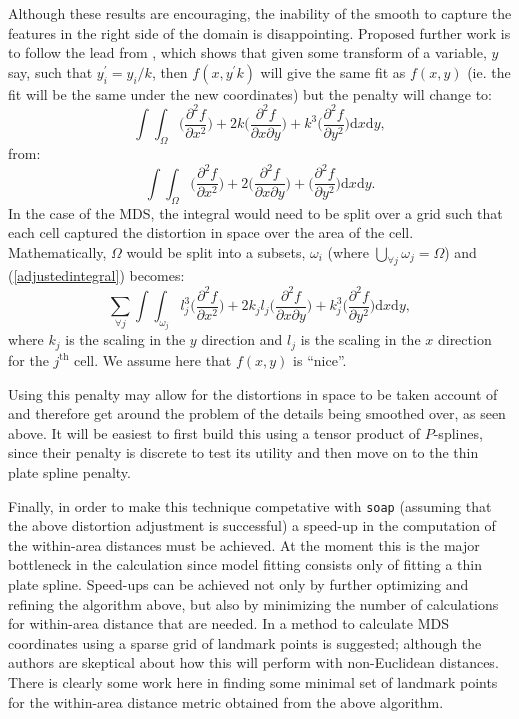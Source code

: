 \documentclass[a4paper,10pt]{article}
\begin{document}
Although these results are encouraging, the inability of the smooth to capture the features in the right side of the domain is disappointing. Proposed further work is to follow the lead from \cite{wood2000}, which shows that given some transform of a variable, $y$ say, such that $y_i^\prime=y_i/k$, then $f(x,y^\prime k)$ will give the same fit as $f(x,y)$ (ie. the fit will be the same under the new coordinates) but the penalty will change to:
\begin{equation}
\int\int_\Omega \Big( \frac{\partial^2 f}{\partial x^2} \Big) + 2k\Big( \frac{\partial^2 f}{\partial x \partial y} \Big) + k^3\Big( \frac{\partial^2 f}{\partial y^2} \Big) \text{d}x \text{d}y,
\label{adjustedintegral}
\end{equation}
from:
\begin{equation*}
\int\int_\Omega \Big( \frac{\partial^2 f}{\partial x^2} \Big) + 2\Big( \frac{\partial^2 f}{\partial x \partial y} \Big) + \Big( \frac{\partial^2 f}{\partial y^2} \Big) \text{d}x \text{d}y.
\end{equation*}
In the case of the MDS, the integral would need to be split over a grid such that each cell captured the distortion in space over the area of the cell. Mathematically, $\Omega$ would be split into a subsets, $\omega_i$ (where $\bigcup_{\forall j} \omega_j = \Omega$) and (\ref{adjustedintegral}) becomes:
\begin{equation}
\sum_{\forall j} \int\int_{\omega_j} l_j^3 \Big( \frac{\partial^2 f}{\partial x^2} \Big) + 2k_jl_j\Big( \frac{\partial^2 f}{\partial x \partial y} \Big) + k_j^3\Big( \frac{\partial^2 f}{\partial y^2} \Big) \text{d}x \text{d}y,
\label{adjustedintegral}
\end{equation}
where $k_j$ is the scaling in the $y$ direction and $l_j$ is the scaling in the $x$ direction for the $j^{\text{th}}$ cell. We assume here that $f(x,y)$ is ``nice''.

Using this penalty may allow for the distortions in space to be taken account of and therefore get around the problem of the details being smoothed over, as seen above. It will be easiest to first build this using a tensor product of $P$-splines, since their penalty is discrete to test its utility and then move on to the thin plate spline penalty.

Finally, in order to make this technique competative with \texttt{soap} (assuming that the above distortion adjustment is successful) a speed-up in the computation of the within-area distances must be achieved. At the moment this is the major bottleneck in the calculation since model fitting consists only of fitting a thin plate spline. Speed-ups can be achieved not only by further optimizing and refining the algorithm above, but also by minimizing the number of calculations for within-area distance that are needed. In \cite{landmark} a method to calculate MDS coordinates using a sparse grid of landmark points is suggested; although the authors are skeptical about how this will perform with non-Euclidean distances. There is clearly some work here in finding some minimal set of landmark points for the within-area distance metric obtained from the above algorithm.




\end{document}

